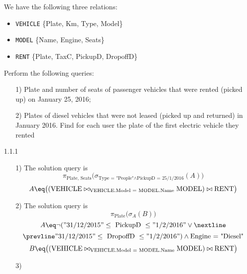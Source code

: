 \begin{exercise}
    We have the following three relations:
    \begin{itemize}
        \item \texttt{VEHICLE} \{Plate, Km, Type, Model\}
        \item \texttt{MODEL} \{Name, Engine, Seats\}
        \item \texttt{RENT} \{Plate, TaxC, PickupD, DropoffD\}
    \end{itemize}

    Perform the following queries:
    \begin{itemize}
        \item [1)] Plate and number of seats of passenger vehicles that were rented (picked up) on January 25, 2016;
        \item [2)] Plates of diesel vehicles that were not leased (picked up and returned) in January 2016. Find for each user the plate of the first electric vehicle they rented
    \end{itemize}
    \vspace{12pt}
\end{exercise}
\begin{solution}{1.1.1}
    \begin{itemize}
        \item [1)] The solution query is
        \[ \pi_{\text{Plate, Seats}} \big( \sigma_{\text{Type = "People"} \wedge \text{PickupD = 25/1/2016}} (A) \big)\]
        \[ A \eq \big((\text{VEHICLE} \bowtie_{\text{VEHICLE.Model = MODEL.Name}} \text{MODEL}) \bowtie \text{RENT} \big) \]
        \item [2)] The solution query is
        \[ \pi_{\text{Plate}} \big( \sigma_{A} (B) \big) \]
        \[ A \eq \neg ("31/12/2015" \leq \text{ PickupD } \leq "1/2/2016" \vee \nextline \]
        \[ \prevline "31/12/2015" \leq \text{ DropoffD } \leq "1/2/2016") \wedge \text{Engine = "Diesel"} \]
        \[ B \eq \big((\text{VEHICLE} \bowtie_{\text{VEHICLE.Model = MODEL.Name}} \text{MODEL}) \bowtie \text{RENT} \big) \]
        \item [3)] 
    \end{itemize}
\end{solution}
